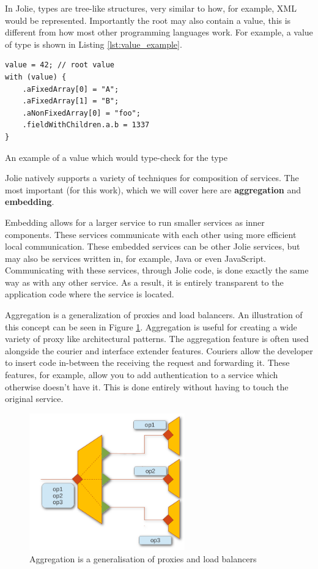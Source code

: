 In Jolie, types are tree-like structures, very similar to how, for example, XML
would be represented. Importantly the root may also contain a value, this is
different from how most other programming languages work. For example, a value
of type  is shown in Listing \ref{lst:value_example}.

\begin{listing}[H]
\begin{verbatim}
value = 42; // root value
with (value) {
    .aFixedArray[0] = "A";
    .aFixedArray[1] = "B";
    .aNonFixedArray[0] = "foo";
    .fieldWithChildren.a.b = 1337
}
\end{verbatim}

\caption{An example of a value which would type-check for the type
    }

\label{lst:value_example}
\end{listing}

Jolie natively supports a variety of techniques for composition of services.
The most important (for this work), which we will cover here are
\textbf{aggregation} and \textbf{embedding}.

Embedding allows for a larger service to run smaller services as inner
components. These services communicate with each other using more efficient
local communication. These embedded services can be other Jolie services, but
may also be services written in, for example, Java or even JavaScript.
Communicating with these services, through Jolie code, is done exactly the same
way as with any other service. As a result, it is entirely transparent to the
application code where the service is located.

Aggregation is a generalization of proxies and load balancers. An illustration
of this concept can be seen in Figure \ref{fig:aggregation}. Aggregation is
useful for creating a wide variety of proxy like architectural patterns. The
aggregation feature is often used alongside the courier and interface extender
features. Couriers allow the developer to insert code in-between the receiving
the request and forwarding it. These features, for example, allow you to add
authentication to a service which otherwise doesn't have it. This is done
entirely without having to touch the original service.

\begin{figure}[H]
    \centering
    \includegraphics[width=0.6\textwidth]{pictures/aggregation.png}
    \caption{Aggregation is a generalisation of proxies and load balancers}
    \label{fig:aggregation}
\end{figure}

